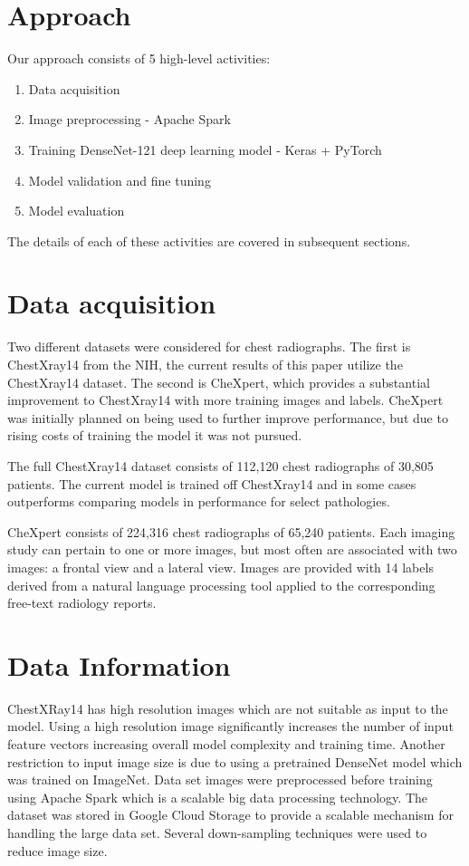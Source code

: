 \documentclass{amia}
\begin{document}
\section*{Approach}

Our approach consists of 5 high-level activities:
\begin{enumerate}
\item Data acquisition
\item Image preprocessing - Apache Spark
\item Training DenseNet-121 deep learning model - Keras + PyTorch
\item Model validation and fine tuning
\item Model evaluation
\end{enumerate}

The details of each of these activities are covered in subsequent sections.

\section*{Data acquisition}
Two different datasets were considered for chest radiographs. The first is ChestXray14 from the NIH, the current results of this paper utilize the ChestXray14 dataset. The second is CheXpert, which provides a substantial improvement to ChestXray14 with more training images and labels. CheXpert was initially planned on being used to further improve performance, but due to rising costs of training the model it was not pursued.

The full ChestXray14 dataset consists of 112,120 chest radiographs of 30,805 patients. The current model is trained off ChestXray14 and in some cases outperforms comparing models in performance for select pathologies.

CheXpert\cite{ref2} consists of 224,316 chest radiographs of 65,240 patients. Each imaging study can pertain to one or more images, but most often are associated with two images: a frontal view and a lateral view. Images are provided with 14 labels derived from a natural language processing tool applied to the corresponding free-text radiology reports.

\section*{Data Information}

ChestXRay14\cite{ref2} has high resolution images which are not suitable as input to the model. Using a high resolution image significantly increases the number of input feature vectors increasing overall model complexity and training time. Another restriction to input image size is due to using a pretrained DenseNet model which was trained on ImageNet. Data set images were preprocessed before training using Apache Spark which is a scalable big data processing technology. The dataset was stored in Google Cloud Storage to provide a scalable mechanism for handling the large data set. Several down-sampling techniques were used to reduce image size.
\end{document}

